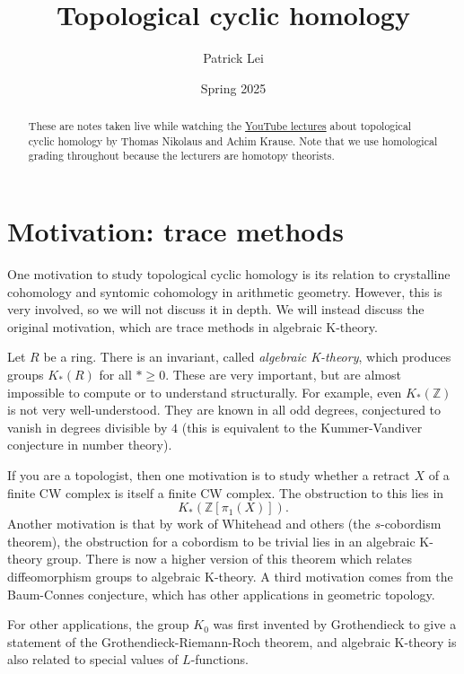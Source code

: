 \documentclass[10pt]{amsart}
\title{Topological cyclic homology}
\author{Patrick Lei}
\date{Spring 2025}
\theoremstyle{definition}
\theoremstyle{remark}
\theoremstyle{plain}
\theoremstyle{definition}
\theoremstyle{remark}
\newcommand{\Z}{\mathbb{Z}}
\newcommand{\1}{\mathbf{1}}
\newcommand{\2}{\mathbf{2}}
\newcommand{\3}{\mathbf{3}}
\begin{document}
\begin{abstract}
    These are notes taken live while watching the \href{https://www.youtube.com/playlist?list=PLsmqTkj4MGTB8pNGvW0iuKUFmBlOSke-C}{YouTube lectures} about topological cyclic homology by Thomas Nikolaus and Achim Krause. Note that we use homological grading throughout because the lecturers are homotopy theorists.
\end{abstract}
\maketitle
\tableofcontents

\section{Motivation: trace methods}%
\label{sec:Motivation}

One motivation to study topological cyclic homology is its relation to crystalline cohomology and syntomic cohomology in arithmetic geometry. However, this is very involved, so we will not discuss it in depth. We will instead discuss the original motivation, which are trace methods in algebraic K-theory.

Let $R$ be a ring. There is an invariant, called \textit{algebraic K-theory}, which produces groups $K_*(R)$ for all $* \geq 0$. These are very important, but are almost impossible to compute or to understand structurally. For example, even $K_*(\Z)$ is not very well-understood. They are known in all odd degrees, conjectured to vanish in degrees divisible by $4$ (this is equivalent to the Kummer-Vandiver conjecture in number theory). 

If you are a topologist, then one motivation is to study whether a retract $X$ of a finite CW complex is itself a finite CW complex. The obstruction to this lies in 
\[
    K_*(\Z[\pi_1(X)]).
\]
Another motivation is that by work of Whitehead and others (the $s$-cobordism theorem), the obstruction for a cobordism to be trivial lies in an algebraic K-theory group. There is now a higher version of this theorem which relates diffeomorphism groups to algebraic K-theory. A third motivation comes from the Baum-Connes conjecture, which has other applications in geometric topology. 

For other applications, the group $K_0$ was first invented by Grothendieck to give a statement of the Grothendieck-Riemann-Roch theorem, and algebraic K-theory is also related to special values of $L$-functions. 
\end{document}
